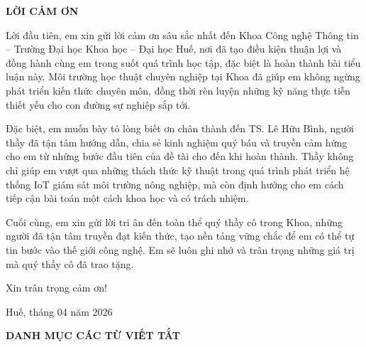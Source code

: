 \documentclass[12pt, a4paper]{article}
\begin{document}
\thispagestyle{empty}
\vspace*{0.4cm}
\begin{center}
  \fontsize{17}{21}\selectfont\bfseries LỜI CẢM ƠN\par
\end{center}
\vspace{0.6cm}

\parindent=1.1cm
\setlength{\parskip}{0.55ex plus 0.2ex}

Lời đầu tiên, em xin gửi lời cảm ơn sâu sắc nhất đến Khoa Công nghệ Thông tin – Trường Đại học Khoa học – Đại học Huế, nơi đã tạo điều kiện thuận lợi và đồng hành cùng em trong suốt quá trình học tập, đặc biệt là hoàn thành bài tiểu luận này. Môi trường học thuật chuyên nghiệp tại Khoa đã giúp em không ngừng phát triển kiến thức chuyên môn, đồng thời rèn luyện những kỹ năng thực tiễn thiết yếu cho con đường sự nghiệp sắp tới.

Đặc biệt, em muốn bày tỏ lòng biết ơn chân thành đến TS. Lê Hữu Bình, người thầy đã tận tâm hướng dẫn, chia sẻ kinh nghiệm quý báu và truyền cảm hứng cho em từ những bước đầu tiên của đề tài cho đến khi hoàn thành. Thầy không chỉ giúp em vượt qua những thách thức kỹ thuật trong quá trình phát triển hệ thống IoT giám sát môi trường nông nghiệp, mà còn định hướng cho em cách tiếp cận bài toán một cách khoa học và có trách nhiệm.

Cuối cùng, em xin gửi lời tri ân đến toàn thể quý thầy cô trong Khoa, những người đã tận tâm truyền đạt kiến thức, tạo nền tảng vững chắc để em có thể tự tin bước vào thế giới công nghệ. Em sẽ luôn ghi nhớ và trân trọng những giá trị mà quý thầy cô đã trao tặng.

Xin trân trọng cảm ơn!

\parindent=0pt
\parskip=0pt
\vspace{0.5cm}
\hfill\begin{minipage}[t]{7cm}
  \fontsize{13}{17}\selectfont
  \begin{flushright}
    Huế, tháng 04 năm 2026
  \end{flushright}
\end{minipage}

\newpage

\thispagestyle{empty}
\vspace*{0.4cm}
\begin{center}
  \fontsize{17}{21}\selectfont\bfseries DANH MỤC CÁC TỪ VIẾT TẮT
\end{center}
\vspace{0.5cm}
\end{document}

